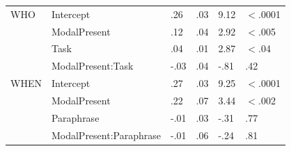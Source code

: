\documentclass[12pt,letterpaper,table,svgnames,dvipsnames]{article}
\begin{document}
\begin{table}
\begin{center}
\begin{tabular}{l|lllll}
\bottomrule
\toprule
WHO & Intercept & .26 & .03 & 9.12 & $<$.0001\\
{} & ModalPresent & .12 & .04 & 2.92 & $<$.005\\
{} & Task & .04 & .01 & 2.87 & $<$.04\\
{} & ModalPresent:Task & -.03 & .04 & -.81 & .42\\
\bottomrule
\toprule
WHEN & Intercept & .27 & .03 & 9.25 & $<$.0001\\
{} & ModalPresent & .22 & .07 & 3.44 & $<$.002\\
{} & Paraphrase & -.01 & .03 & -.31 & .77\\
{} & ModalPresent:Paraphrase & -.01 & .06 & -.24 & .81\\
\bottomrule
\end{tabular} 
\end{center} 
\end{table}
\end{document}
